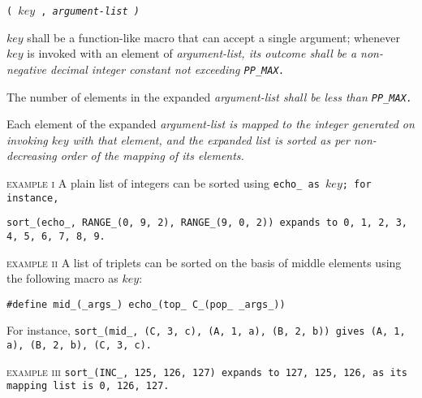 
 \tt{(} $key$ \tt{,} \it{argument-list} \tt{)}


$key$ shall be a function-like macro that can accept a single argument;
whenever $key$ is invoked with an element of \it{argument-list}, its outcome
shall be a non-negative decimal integer constant not exceeding \tt{PP_MAX}.

The number of elements in the expanded
\it{argument-list} shall be less than \tt{PP_MAX}.


Each element of the expanded \it{argument-list} is mapped to the integer
generated on invoking $key$ with that element, and the expanded list
is sorted as per non-decreasing order of the mapping of its elements.

\textsc{example i}\indent
A plain list of integers can be sorted using \tt{echo_} as $key$; for instance,

\tt{sort_(echo_, RANGE_(0, 9, 2), RANGE_(9, 0, 2))}
expands to \tt{0, 1, 2, 3, 4, 5, 6, 7, 8, 9}.

\textsc{example ii}\indent
A list of triplets can be sorted on the basis of
middle elements using the following macro as $key$:

\centerline{\tt{#define mid_(_args_) echo_(top_ C_(pop_ _args_))}}

For instance, \tt{sort_(mid_, (C, 3, c), (A, 1, a), (B, 2, b))}
gives \tt{(A, 1, a), (B, 2, b), (C, 3, c)}.

\textsc{example iii}\indent
\tt{sort_(INC_, 125, 126, 127)} expands to \tt{127, 125, 126},
as its mapping list is \tt{0, 126, 127}.
